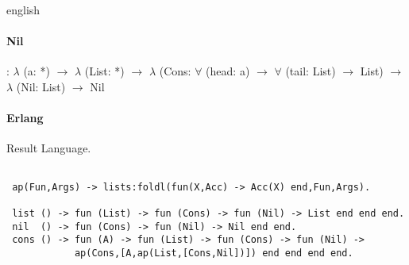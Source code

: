 \documentclass{abstract}
\begin{document}
\begin{theses}{english}
\paragraph{Nil}: $\lambda$ (a: *)
$\rightarrow$ $\lambda$ (List: *)
$\rightarrow$ $\lambda$ (Cons:
    $\forall$ (head: a)
  $\rightarrow$ $\forall$ (tail: List)
    $\rightarrow$ List)
$\rightarrow$ $\lambda$ (Nil: List)
$\rightarrow$ Nil


\paragraph{Erlang}

Result Language.

\begin{lstlisting}[mathescape=true]

 ap(Fun,Args) -> lists:foldl(fun(X,Acc) -> Acc(X) end,Fun,Args).

 list () -> fun (List) -> fun (Cons) -> fun (Nil) -> List end end end.
 nil  () -> fun (Cons) -> fun (Nil) -> Nil end end.
 cons () -> fun (A) -> fun (List) -> fun (Cons) -> fun (Nil) -> 
            ap(Cons,[A,ap(List,[Cons,Nil])]) end end end end.
\end{lstlisting}

\end{theses}
\end{document}
